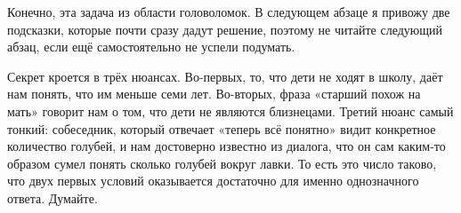 Конечно, эта задача из области головоломок. В следующем абзаце я привожу две подсказки, которые почти сразу дадут решение, поэтому не читайте следующий абзац, если ещё самостоятельно не успели подумать.

Секрет кроется в трёх нюансах. Во-первых, то, что дети не ходят в школу, даёт нам понять, что им меньше семи лет. Во-вторых, фраза «старший похож на мать» говорит нам о том, что дети не являются близнецами. Третий нюанс самый тонкий: собеседник, который отвечает «теперь всё понятно» видит конкретное количество голубей, и нам достоверно известно из диалога, что он сам каким-то образом сумел понять сколько голубей вокруг лавки. То есть это число таково, что двух первых условий оказывается достаточно для именно однозначного ответа. Думайте.
